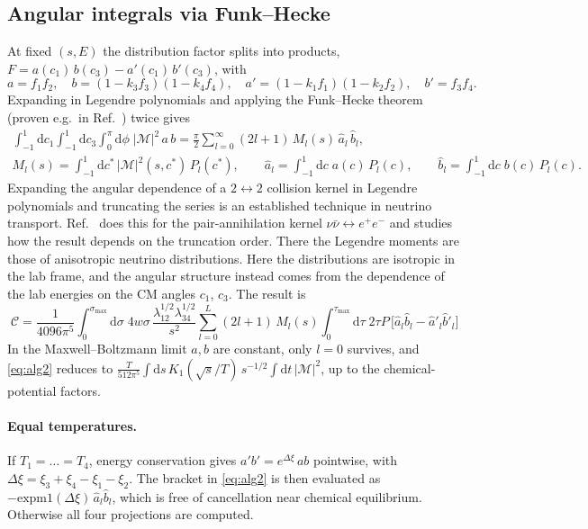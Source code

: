 \documentclass[11pt,a4paper]{article}
\newcommand{\dd}{\mathrm{d}}
\newcommand{\Msq}{|\mathcal{M}|^2}
\begin{document}
\subsection{Angular integrals via Funk--Hecke}

At fixed $(s,E)$ the distribution factor splits into products,
$F=a(c_1)\,b(c_3)-a'(c_1)\,b'(c_3)$, with
\begin{equation}
  a = f_1f_2,\quad b=(1-k_3f_3)(1-k_4f_4),\quad
  a'=(1-k_1f_1)(1-k_2f_2),\quad b' = f_3f_4 .
\end{equation}
Expanding in Legendre polynomials and applying the Funk--Hecke theorem (proven e.g.\ in
Ref.~\cite{Mueller:1998}) twice gives
\begin{gather}
  \int_{-1}^1\!\dd c_1\int_{-1}^1\!\dd c_3\int_0^\pi\!\dd\phi\;\Msq\,a\,b
  = \frac{\pi}{2}\sum_{l=0}^\infty(2l+1)\,M_l(s)\,\hat a_l\,\hat b_l,\\
  M_l(s) = \int_{-1}^1\dd c^*\,\Msq(s,c^*)\,P_l(c^*),\qquad
  \hat a_l = \int_{-1}^1\dd c\;a(c)\,P_l(c),\qquad
  \hat b_l = \int_{-1}^1\dd c\;b(c)\,P_l(c).
\end{gather}
Expanding the angular dependence of a $2\leftrightarrow2$ collision kernel
in Legendre polynomials and truncating the series is an established technique
in neutrino transport. Ref.~\cite{Pons:1998} does this for the pair-annihilation
kernel $\nu\bar\nu\leftrightarrow e^+e^-$ and studies how the result depends
on the truncation order. There the Legendre moments are those of anisotropic
neutrino distributions. Here the distributions are isotropic in the lab frame,
and the angular structure instead comes from the dependence of the lab
energies on the CM angles $c_1$, $c_3$.
The result is
\begin{equation}
  \boxed{\;
  \mathcal{C} = \frac{1}{4096\pi^5}\int_0^{\sigma_{\max}}\!\dd\sigma\;
  4w\sigma\,\frac{\lambda_{12}^{1/2}\lambda_{34}^{1/2}}{s^2}
  \sum_{l=0}^{L}(2l+1)\,M_l(s)
  \int_0^{\tau_{\max}}\!\dd\tau\;2\tau P\,
  \big[\hat a_l\hat b_l-\hat a'_l\hat b'_l\big]\;}
  \label{eq:alg2}
\end{equation}
In the Maxwell--Boltzmann limit $a,b$ are constant, only $l=0$ survives, and
\eqref{eq:alg2} reduces to
$\frac{T}{512\pi^5}\int\dd s\,K_1(\sqrt s/T)\,s^{-1/2}\int\dd t\,\Msq$,
up to the chemical-potential factors.

\paragraph{Equal temperatures.}
If $T_1=\dots=T_4$, energy conservation gives $a'b'=e^{\Delta\xi}\,ab$
pointwise, with $\Delta\xi=\xi_3+\xi_4-\xi_1-\xi_2$. The bracket in
\eqref{eq:alg2} is then evaluated as $-\mathrm{expm1}(\Delta\xi)\,\hat a_l\hat b_l$,
which is free of cancellation near chemical equilibrium. Otherwise all four
projections are computed.
\end{document}
